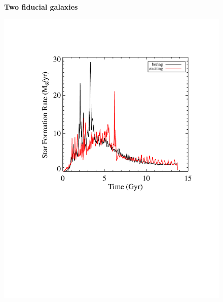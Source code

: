 \documentclass[nofootinbib,twocolumn,prd]{emulateapj}
\begin{document}
\begin{figure}
\caption{\textbf{Two fiducial galaxies}
}
\end{figure}


\begin{figure}
\includegraphics[width=\columnwidth]{Figures/sfh}

\end{figure}
\end{document}
